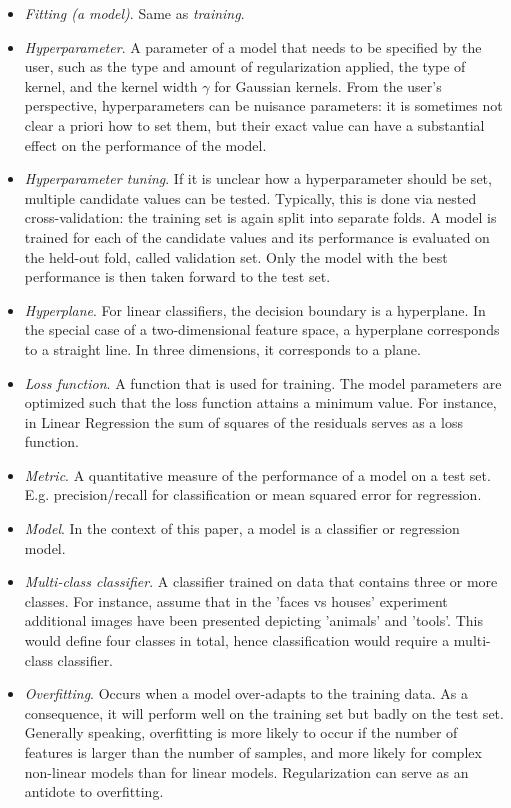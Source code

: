 \documentclass[utf8]{frontiersSCNS} %
\begin{document}
\begin{itemize}
\item \textit{Fitting (a model)}. Same as \textit{training}.
\item \textit{Hyperparameter}. A parameter of a model that needs to be specified by the user, such as the type and amount of regularization applied, the type of kernel, and the kernel width $\gamma$ for Gaussian kernels. From the user's perspective, hyperparameters can be nuisance parameters: it is sometimes not clear a priori how to set them, but their exact value can have a substantial effect on the performance of the model.
\item \textit{Hyperparameter tuning}. If it is unclear how a hyperparameter should be set, multiple candidate values can be tested. Typically, this is done via nested cross-validation: the training set is again split into separate folds. A model is trained for each of the candidate values and its performance is evaluated on the held-out fold, called validation set. Only the model with the best performance is then taken forward to the test set.
\item \textit{Hyperplane}. For linear classifiers, the decision boundary is a hyperplane. In the special case of a two-dimensional feature space, a hyperplane corresponds to a straight line. In three dimensions, it corresponds to a plane. 
\item \textit{Loss function}. A function that is used for training. The model parameters are optimized such that the loss function attains a minimum value. For instance, in Linear Regression the sum of squares of the residuals serves as a loss function.
\item \textit{Metric}. A quantitative measure of the performance of a model on a test set. E.g. precision/recall for classification or mean squared error for regression.
\item \textit{Model}. In the context of this paper, a model is a classifier or regression model.
\item \textit{Multi-class classifier}. A classifier trained on data that contains three or more classes. For instance, assume that in the 'faces vs houses' experiment additional images have been presented depicting 'animals' and 'tools'. This would define four classes in total, hence  classification would require a multi-class classifier.
\item \textit{Overfitting}. Occurs when a model over-adapts to the training data. As a consequence, it will perform well on the training set but badly on the test set. Generally speaking, overfitting is more likely to occur if the number of features is larger than the number of samples, and more likely for complex non-linear models than for linear models. Regularization can serve as an antidote to overfitting.

\end{itemize}
\end{document}
